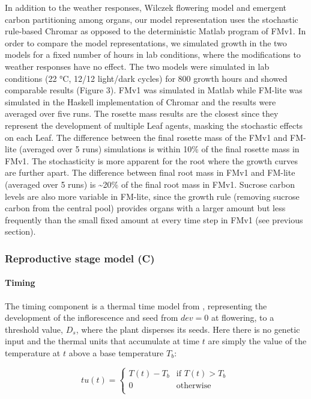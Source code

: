 \documentclass[phd]{infthesis}
\begin{document}
In addition to the weather responses, Wilczek flowering model and
emergent carbon partitioning among organs, our model representation uses
the stochastic rule-based Chromar as opposed to the deterministic Matlab
program of FMv1. In order to compare the model representations, we
simulated growth in the two models for a fixed number of hours in lab
conditions, where the modifications to weather responses have no effect.
The two models were simulated in lab conditions (22 °C, 12/12 light/dark
cycles) for \(800\) growth hours and showed comparable results (Figure
3). FMv1 was simulated in Matlab while FM-lite was simulated in the
Haskell implementation of Chromar and the results were averaged over
five runs. The rosette mass results are the closest since they represent
the development of multiple Leaf agents, masking the stochastic effects
on each Leaf. The difference between the final rosette mass of the FMv1
and FM-lite (averaged over 5 runs) simulations is within 10\% of the
final rosette mass in FMv1. The stochasticity is more apparent for the
root where the growth curves are further apart. The difference between
final root mass in FMv1 and FM-lite (averaged over 5 runs) is
\textasciitilde{}20\% of the final root mass in FMv1. Sucrose carbon
levels are also more variable in FM-lite, since the growth rule
(removing sucrose carbon from the central pool) provides organs with a
larger amount but less frequently than the small fixed amount at every
time step in FMv1 (see previous section).

\subsubsection{Reproductive stage model
  (C)}
\label{reproductive-stage-model-c}

\paragraph{Timing}
\label{timing-1}

The timing component is a thermal time model from
\citet{burghardt_modeling_2015}, representing the development of the
inflorescence and seed from \(dev = 0\) at flowering, to a threshold value,
\(D_{s}\), where the plant disperses its seeds. Here there is no genetic input
and the thermal units that accumulate at time \(t\) are simply the value of the
temperature at \(t\) above a base temperature \(T_{b}\):

\[tu(t) = \left\{ \begin{matrix}
T(t) - T_{b} & \text{if\ }T(t) > T_{b} \\
0 & \text{otherwise} \\
\end{matrix} \right.\ \]
\end{document}
